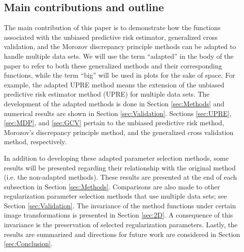 \documentclass[12pt]{article}
\begin{document}
\subsection{Main contributions and outline}
The main contribution of this paper is to demonstrate how the functions associated with the unbiased predictive risk estimator, generalized cross validation, and the Morozov discrepancy principle methods can be adapted to handle multiple data sets. We will use the term ``adapted'' in the body of the paper to refer to both these generalized methods and their corresponding functions, while the term ``big'' will be used in plots for the sake of space. For example, the adapted UPRE method means the extension of the unbiased predictive risk estimator method (UPRE) for multiple data sets. The development of the adapted methods is done in Section \ref{sec:Methods} and numerical results are shown in Section \ref{sec:Validation}. Sections \ref{sec:UPRE}, \ref{sec:MDP}, and \ref{sec:GCV} pertain to the unbiased predictive risk method, Morozov's discrepancy principle method, and the generalized cross validation method, respectively.  \par 
In addition to developing these adapted parameter selection methods, some results will be presented regarding their relationship with the original method (i.e. the non-adapted methods). These results are presented at the end of each subsection in Section \ref{sec:Methods}. Comparisons are also made to other regularization parameter selection methods that use multiple data sets; see Section \ref{sec:Validation}. The invariance of the method functions under certain image transformations is presented in Section \ref{sec:2D}.  A consequence of this invariance is the preservation of selected regularization parameters. Lastly, the results are summarized and directions for future work are considered in Section \ref{sec:Conclusion}. 
\end{document}
